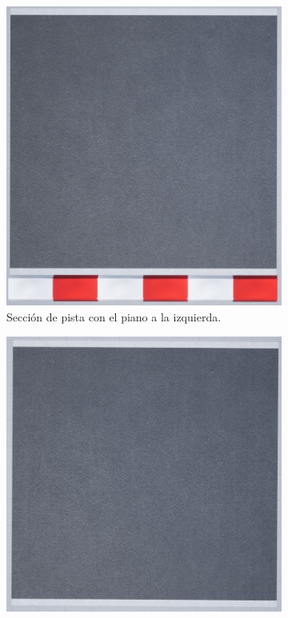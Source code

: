\begin{figure}[H]
\begin{subfigure}[t]{0.48\textwidth}
        \includegraphics[width=\textwidth]{imagenes/converted/pista/track-final-inverted.jpg}
        \caption{Sección de pista con el piano a la izquierda.}
        \label{fig:curvafinal3}
    \end{subfigure}
    \par\bigskip
    \begin{subfigure}[t]{0.48\textwidth}
        \centering
        \includegraphics[width=\textwidth]{imagenes/converted/pista/track-straight-final.jpg}

\end{subfigure}
\end{figure}
